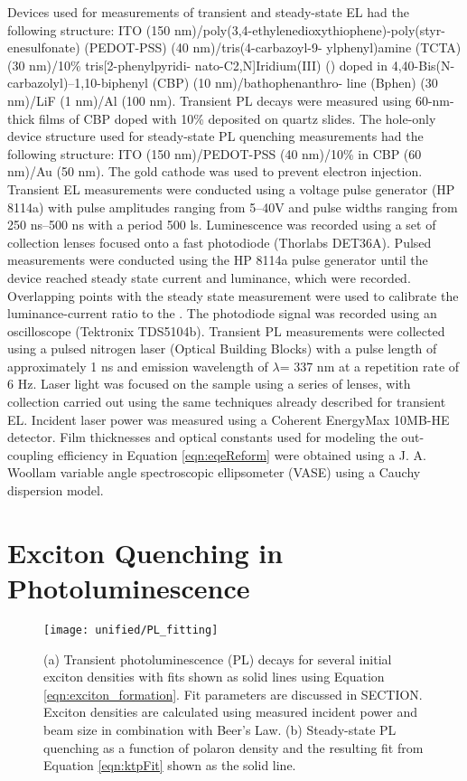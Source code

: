 \documentclass[../thesis.tex]{subfiles}
\begin{document}
Devices used for measurements of transient and steady-state EL had the following structure: ITO (150 nm)/poly(3,4-ethylenedioxythiophene)-poly(styr- enesulfonate) (PEDOT-PSS) (40 nm)/tris(4-carbazoyl-9- ylphenyl)amine (TCTA) (30 nm)/10\% tris[2-phenylpyridi- nato-C2,N]Iridium(III) (\irppy) doped in 4,40-Bis(N- carbazolyl)–1,10-biphenyl (CBP) (10 nm)/bathophenanthro- line (Bphen) (30 nm)/LiF (1 nm)/Al (100 nm). 
Transient PL decays were measured using 60-nm-thick films of CBP doped with 10\% \irppy deposited on quartz slides. 
The hole-only device structure used for steady-state PL quenching measurements had the following structure: ITO (150 nm)/PEDOT-PSS (40 nm)/10\% \irppy in CBP (60 nm)/Au (50 nm). The gold cathode was used to prevent electron injection. 
Transient EL measurements were conducted using a voltage pulse generator (HP 8114a) with pulse amplitudes ranging from 5–40V and pulse widths ranging from 250 ns–500 ns with a period 500 ls. 
Luminescence was recorded using a set of collection lenses focused onto a fast photodiode (Thorlabs DET36A). 
Pulsed \eqe measurements were conducted using the HP 8114a pulse generator until the device reached steady state current and luminance, which were recorded.  
Overlapping points with the steady state \eqe measurement were used to calibrate the luminance-current ratio to the \eqe.
The photodiode signal was recorded using an oscilloscope (Tektronix TDS5104b). 
Transient PL measurements were collected using a
pulsed nitrogen laser (Optical Building Blocks) with a pulse length of approximately 1 ns and emission wavelength of $\lambda$= 337 nm at a repetition rate of 6 Hz. Laser light was focused on the sample using a series of lenses, with collection carried out using the same techniques already described for transient EL. 
Incident laser power was measured using a Coherent EnergyMax 10MB-HE detector. 
Film thicknesses and optical constants used for modeling the out-coupling efficiency in Equation \ref{eqn:eqeReform} were obtained using a J. A. Woollam variable angle spectroscopic ellipsometer (VASE) using a Cauchy dispersion model.



\section{Exciton Quenching in Photoluminescence}\label{sec:pl_measurements}

\begin{wrapfigure}{R}{0.5\textwidth}
\centering
\texttt{[image: unified/PL\_fitting]}
\caption{(a) Transient photoluminescence (PL) decays for several initial exciton densities with fits shown as solid lines using Equation \ref{eqn:exciton_formation}.  Fit parameters are discussed in SECTION.  Exciton densities are calculated using measured incident power and beam size in combination with Beer's Law.  (b) Steady-state PL quenching as a function of polaron density and the resulting fit from Equation \ref{eqn:ktpFit} shown as the solid line.}
\label{fig:PL_fitting}
\end{wrapfigure}
\end{document}
